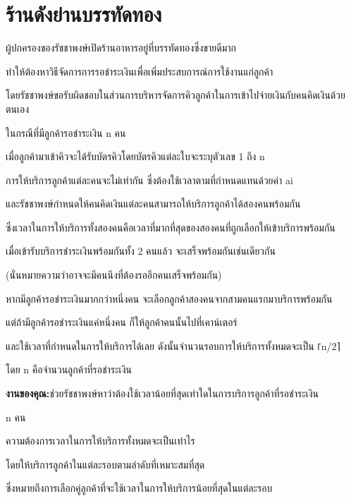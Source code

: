 \documentclass{article}
\begin{document}
\section*{ร้านดังย่านบรรทัดทอง}

ผู้ปกครองของรัชชาพงษ์เปิดร้านอาหารอยู่ที่บรรทัดทองซึ่งขายดีมาก

ทำให้ต้องหาวิธีจัดการการรอชำระเงินเพื่อเพิ่มประสบการณ์การใช้งานแก่ลูกค้า

โดยรัชชาพงษ์ขอรับผิดชอบในส่วนการบริหารจัดการคิวลูกค้าในการเข้าไปจ่ายเงินกับคนคิดเงินด้วยตนเอง

ในกรณีที่มีลูกค้ารอชำระเงิน n คน

เมื่อลูกค้ามาเข้าคิวจะได้รับบัตรคิวโดยบัตรคิวแต่ละใบจะระบุตัวเลข 1 ถึง n

การให้บริการลูกค้าแต่ละคนจะไม่เท่ากัน ซึ่งต้องใช้เวลาตามที่กำหนดแทนด้วยค่า ai

และรัชชาพงษ์กำหนดให้คนคิดเงินแต่ละคนสามารถให้บริการลูกค้าได้สองคนพร้อมกัน

ซึ่งเวลาในการให้บริการทั้งสองคนคือเวลาที่มากที่สุดของสองคนที่ถูกเลือกให้เข้าบริการพร้อมกัน

เมื่อเข้ารับบริการชำระเงินพร้อมกันทั้ง 2 คนแล้ว จะเสร็จพร้อมกันเช่นเดียวกัน

(นั่นหมายความว่าอาจจะมีคนนึงที่ต้องรออีกคนเสร็จพร้อมกัน)



หากมีลูกค้ารอชำระเงินมากกว่าหนึ่งคน จะเลือกลูกค้าสองคนจากสามคนแรกมาบริการพร้อมกัน

แต่ถ้ามีลูกค้ารอชำระเงินแค่หนึ่งคน ก็ให้ลูกค้าคนนั้นไปที่เคาน์เตอร์

และใช้เวลาที่กำหนดในการให้บริการได้เลย ดังนั้นจำนวนรอบการให้บริการทั้งหมดจะเป็น ⌈n/2⌉

โดย n คือจำนวนลูกค้าที่รอชำระเงิน



\textbf{งานของคุณ:}ช่วยรัชชาพงษ์หาว่าต้องใช้เวลาน้อยที่สุดเท่าใดในการบริการลูกค้าที่รอชำระเงิน

n คน



ความต้องการเวลาในการให้บริการทั้งหมดจะเป็นเท่าไร

โดยให้บริการลูกค้าในแต่ละรอบตามลำดับที่เหมาะสมที่สุด

ซึ่งหมายถึงการเลือกคู่ลูกค้าที่จะใช้เวลาในการให้บริการน้อยที่สุดในแต่ละรอบ



\hfill\break
\end{document}
